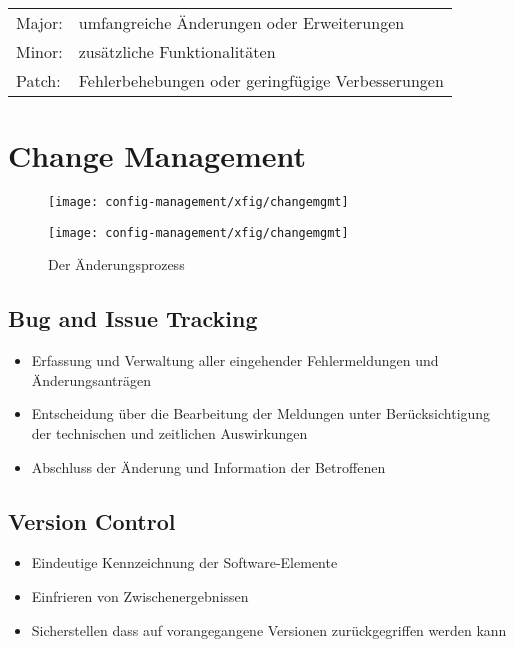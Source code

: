 \begin{tabular}{ll}
Major: & umfangreiche Änderungen oder Erweiterungen\\
Minor: & zusätzliche Funktionalitäten\\
Patch: & Fehlerbehebungen oder geringfügige Verbesserungen\\
\end{tabular}

\newpage
\section{Change Management}
\begin{figure}[H]
\ifslides
\begin{center}
\texttt{[image: config-management/xfig/changemgmt]}\\[2ex]
\end{center}\else
\texttt{[image: config-management/xfig/changemgmt]}
\caption{Der Änderungsprozess}
\fi
\end{figure}
\begin{minipage}[t]{0.48\linewidth}
\subsection*{Bug and Issue Tracking} %
\begin{itemize}
\item Erfassung und Verwaltung aller eingehender Fehlermeldungen
  und \"Anderungsanträgen
\item Entscheidung über die Bearbeitung der Meldungen unter Berücksichtigung
 der technischen und zeitlichen Auswirkungen
\item Abschluss der \"Anderung und Information der Betroffenen
\end{itemize}
\end{minipage}
\hfill
\begin{minipage}[t]{0.48\linewidth}
\subsection{Version Control}
\begin{itemize}
\item Eindeutige Kennzeichnung der Software-Elemente
\item Einfrieren von Zwischenergebnissen
\item Sicherstellen dass auf vorangegangene Versionen
  zurückgegriffen werden kann
\end{itemize}
\end{minipage}
\newslide
